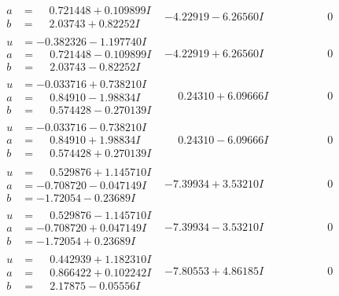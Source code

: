 \documentclass[1p]{elsarticle_modified}
\theoremstyle{definition}
\begin{document}
$$\begin{array}{c|c|c}
\begin{aligned}
a &= \phantom{-}0.721448 + 0.109899 I \\
b &= \phantom{-}2.03743 + 0.82252 I\end{aligned}
 & -4.22919 - 6.26560 I & \phantom{-0.000000 } 0 \\ \hline\begin{aligned}
u &= -0.382326 - 1.197740 I \\
a &= \phantom{-}0.721448 - 0.109899 I \\
b &= \phantom{-}2.03743 - 0.82252 I\end{aligned}
 & -4.22919 + 6.26560 I & \phantom{-0.000000 } 0 \\ \hline\begin{aligned}
u &= -0.033716 + 0.738210 I \\
a &= \phantom{-}0.84910 - 1.98834 I \\
b &= \phantom{-}0.574428 - 0.270139 I\end{aligned}
 & \phantom{-}0.24310 + 6.09666 I & \phantom{-0.000000 } 0 \\ \hline\begin{aligned}
u &= -0.033716 - 0.738210 I \\
a &= \phantom{-}0.84910 + 1.98834 I \\
b &= \phantom{-}0.574428 + 0.270139 I\end{aligned}
 & \phantom{-}0.24310 - 6.09666 I & \phantom{-0.000000 } 0 \\ \hline\begin{aligned}
u &= \phantom{-}0.529876 + 1.145710 I \\
a &= -0.708720 - 0.047149 I \\
b &= -1.72054 - 0.23689 I\end{aligned}
 & -7.39934 + 3.53210 I & \phantom{-0.000000 } 0 \\ \hline\begin{aligned}
u &= \phantom{-}0.529876 - 1.145710 I \\
a &= -0.708720 + 0.047149 I \\
b &= -1.72054 + 0.23689 I\end{aligned}
 & -7.39934 - 3.53210 I & \phantom{-0.000000 } 0 \\ \hline\begin{aligned}
u &= \phantom{-}0.442939 + 1.182310 I \\
a &= \phantom{-}0.866422 + 0.102242 I \\
b &= \phantom{-}2.17875 - 0.05556 I\end{aligned}
 & -7.80553 + 4.86185 I & \phantom{-0.000000 } 0 \\ \hline\begin{aligned}

\end{aligned}
\end{array}$$
\end{document}
